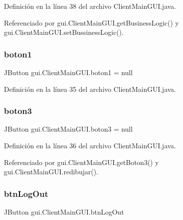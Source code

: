 Definición en la línea 38 del archivo Client\+Main\+G\+U\+I.\+java.



Referenciado por gui.\+Client\+Main\+G\+U\+I.\+get\+Business\+Logic() y gui.\+Client\+Main\+G\+U\+I.\+set\+Bussiness\+Logic().

\mbox{\label{classgui_1_1_client_main_g_u_i_ab21293a77c7d7632b6e92c8514793448}} 
\subsubsection{\texorpdfstring{boton1}{boton1}}
{\footnotesize\ttfamily J\+Button gui.\+Client\+Main\+G\+U\+I.\+boton1 = null\hspace{0.3cm}{\ttfamily [private]}}



Definición en la línea 35 del archivo Client\+Main\+G\+U\+I.\+java.

\mbox{\label{classgui_1_1_client_main_g_u_i_a220469f9ef90dc199698d1c3789a772e}} 
\subsubsection{\texorpdfstring{boton3}{boton3}}
{\footnotesize\ttfamily J\+Button gui.\+Client\+Main\+G\+U\+I.\+boton3 = null\hspace{0.3cm}{\ttfamily [private]}}



Definición en la línea 36 del archivo Client\+Main\+G\+U\+I.\+java.



Referenciado por gui.\+Client\+Main\+G\+U\+I.\+get\+Boton3() y gui.\+Client\+Main\+G\+U\+I.\+redibujar().

\mbox{\label{classgui_1_1_client_main_g_u_i_ac5e8305b963794fa0fe59e49a87e2581}} 
\subsubsection{\texorpdfstring{btnLogOut}{btnLogOut}}
{\footnotesize\ttfamily J\+Button gui.\+Client\+Main\+G\+U\+I.\+btn\+Log\+Out\hspace{0.3cm}{\ttfamily [private]}}



